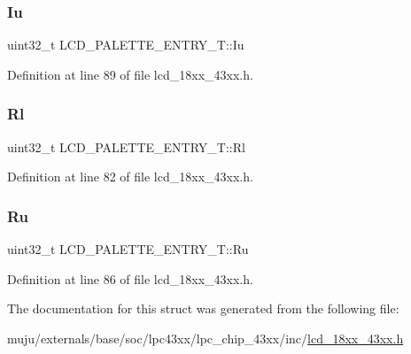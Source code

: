 \subsubsection{\texorpdfstring{Iu}{Iu}}
{\footnotesize\ttfamily uint32\+\_\+t L\+C\+D\+\_\+\+P\+A\+L\+E\+T\+T\+E\+\_\+\+E\+N\+T\+R\+Y\+\_\+\+T\+::\+Iu}



Definition at line 89 of file lcd\+\_\+18xx\+\_\+43xx.\+h.

\mbox{\label{struct_l_c_d___p_a_l_e_t_t_e___e_n_t_r_y___t_a7879af6ecfa5cc741d33ba1eb09dc1ce}} 
\subsubsection{\texorpdfstring{Rl}{Rl}}
{\footnotesize\ttfamily uint32\+\_\+t L\+C\+D\+\_\+\+P\+A\+L\+E\+T\+T\+E\+\_\+\+E\+N\+T\+R\+Y\+\_\+\+T\+::\+Rl}



Definition at line 82 of file lcd\+\_\+18xx\+\_\+43xx.\+h.

\mbox{\label{struct_l_c_d___p_a_l_e_t_t_e___e_n_t_r_y___t_a0677c2826c682286016770d1dd41f677}} 
\subsubsection{\texorpdfstring{Ru}{Ru}}
{\footnotesize\ttfamily uint32\+\_\+t L\+C\+D\+\_\+\+P\+A\+L\+E\+T\+T\+E\+\_\+\+E\+N\+T\+R\+Y\+\_\+\+T\+::\+Ru}



Definition at line 86 of file lcd\+\_\+18xx\+\_\+43xx.\+h.



The documentation for this struct was generated from the following file\+:\begin{DoxyCompactItemize}
\item 
muju/externals/base/soc/lpc43xx/lpc\+\_\+chip\+\_\+43xx/inc/\hyperlink{lcd__18xx__43xx_8h}{lcd\+\_\+18xx\+\_\+43xx.\+h}\end{DoxyCompactItemize}
